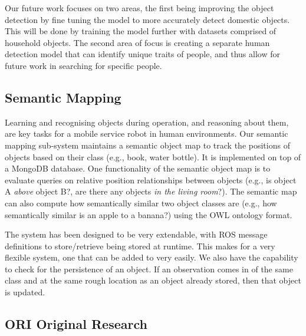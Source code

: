 \documentclass[runningheads,a4paper]{llncs}
\newcommand{\teamori}{Team ORIon}
\begin{document}
Our future work focuses on two areas, the first being improving the object detection by fine tuning the model to more accurately detect domestic objects. This will be done by training the model further with datasets comprised of household objects. The second area of focus is creating a separate human detection model that can identify unique traits of people, and thus allow for future work in searching for specific people.


\subsection{Semantic Mapping}
Learning and recognising objects during operation, and reasoning about them, are key tasks for a mobile service robot in human environments. Our semantic mapping sub-system maintains a semantic object map to track the positions of objects based on their class (e.g., book, water bottle). It is implemented on top of a MongoDB database. One functionality of the semantic object map is to evaluate queries on relative position relationships between objects (e.g., is object A \emph{above} object B?, are there any objects \emph{in the living room}?). The semantic map can also compute how semantically similar two object classes are (e.g., how semantically similar is an apple to a banana?) using the OWL ontology format. 


The system has been designed to be very extendable, with ROS message definitions to store/retrieve being stored at runtime. This makes for a very flexible system, one that can be added to very easily. We also have the capability to check for the persistence of an object. If an observation comes in of the same class and at the same rough location as an object already stored, then that object is updated. 

\subsection{ORI Original Research}
\end{document}
